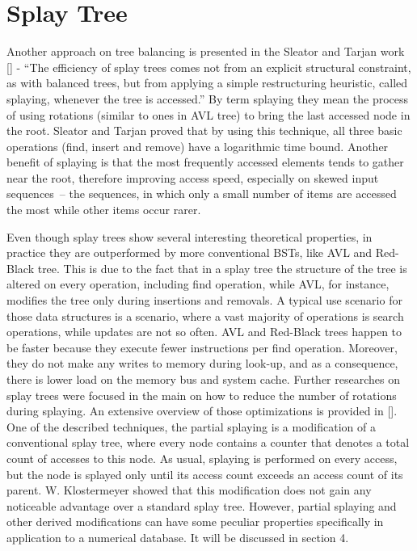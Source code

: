 \section{Splay Tree}

Another approach on tree balancing is presented in the Sleator and Tarjan work [] - “The efficiency of splay trees comes not from an explicit structural constraint, as with balanced trees, but from applying a simple restructuring heuristic, called splaying, whenever the tree is accessed.” By term splaying they mean the process of using rotations (similar to ones in AVL tree) to bring the last accessed node in the root. Sleator and Tarjan proved that by using this technique, all three basic operations (find, insert and remove) have a logarithmic time bound. Another benefit of splaying is that the most frequently accessed elements tends to gather near the root, therefore improving access speed, especially on skewed input sequences~-- the sequences, in which only a small number of items are accessed the most while other items occur rarer.

Even though splay trees show several interesting theoretical properties, in practice they are outperformed by more conventional BSTs, like AVL and Red-Black tree. This is due to the fact that in a splay tree the structure of the tree is altered on every operation, including find operation, while AVL, for instance, modifies the tree only during insertions and removals. A typical use scenario for those data structures is a scenario, where a vast majority of operations is search operations, while updates are not so often. AVL and Red-Black trees happen to be faster because they execute fewer instructions per find operation. Moreover, they do not make any writes to memory during look-up, and as a consequence, there is lower load on the memory bus and system cache. Further researches on splay trees were focused in the main on how to reduce the number of rotations during splaying. An extensive overview of those optimizations is provided in []. One of the described techniques, the partial splaying is a modification of a conventional splay tree, where every node contains a counter that denotes a total count of accesses to this node. As usual, splaying is performed on every access, but the node is splayed only until its access count exceeds an access count of its parent. W. Klostermeyer showed that this modification does not gain any noticeable advantage over a standard splay tree. However, partial splaying and other derived modifications can have some peculiar properties specifically in application to a numerical database. It will be discussed in section 4.

